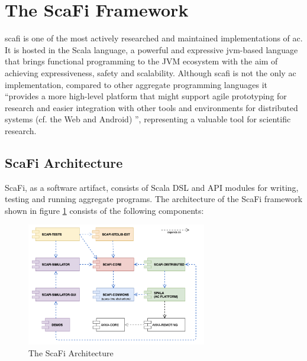 \section{The ScaFi Framework}
\ac{scafi} is one of the most actively researched and maintained implementations of \ac{ac}. 
It is hosted in the Scala language, a powerful and expressive \ac{jvm}-based language that brings functional programming to the JVM ecosystem with the aim of achieving expressiveness, safety and scalability.
Although \ac{scafi} is not the only \ac{ac} implementation, compared to other aggregate programming languages it ``provides a more high-level platform that
might support agile prototyping for research and easier integration with other tools and environments for distributed systems
(cf. the Web and Android) \cite{10.1145/3285956}'', representing a valuable tool for scientific research.

\subsection{ScaFi Architecture}
ScaFi, as a software artifact, consists of Scala DSL and API modules for writing, testing and running aggregate programs. The architecture of the ScaFi framework shown in figure \ref{fig:scafi-architecture} consists of the following components:

\begin{figure}[h]
    \centering
    \includegraphics[width=0.7\textwidth]{figures/scafi-architecture.png}
    \caption{The ScaFi Architecture}
    \label{fig:scafi-architecture}
\end{figure}

